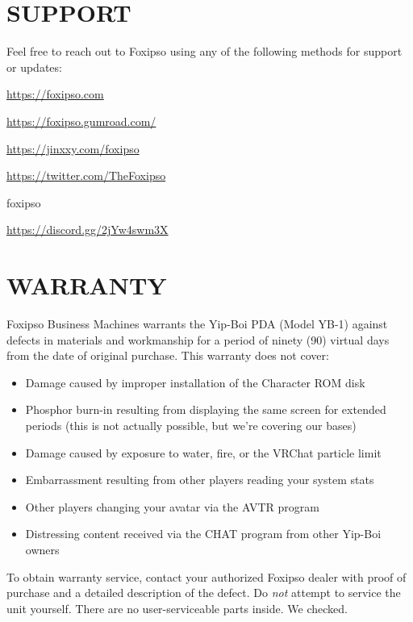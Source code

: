\documentclass[10pt]{article}
\begin{document}
\section{SUPPORT}
\label{sec:support}

Feel free to reach out to Foxipso using any of the following methods for support or updates:

\begin{description}[style=nextline, leftmargin=1em, font=\bfseries\ttfamily, nosep]
  \item[Linktr.ee] \url{https://foxipso.com}
  \item[Gumroad] \url{https://foxipso.gumroad.com/}
  \item[Jinxxy] \url{https://jinxxy.com/foxipso}
  \item[X/Twitter] \url{https://twitter.com/TheFoxipso}
  \item[Discord] foxipso
  \item[Foxipso's Den Discord] \url{https://discord.gg/2jYw4swm3X}
\end{description}

\section{WARRANTY}
\label{sec:warranty}

Foxipso Business Machines warrants the Yip-Boi PDA (Model YB-1) against defects in materials and workmanship for a period of ninety (90) virtual days from the date of original purchase. This warranty does not cover:

\begin{itemize}[leftmargin=2em, nosep]
  \item Damage caused by improper installation of the Character ROM disk
  \item Phosphor burn-in resulting from displaying the same screen for extended periods (this is not actually possible, but we're covering our bases)
  \item Damage caused by exposure to water, fire, or the VRChat particle limit
  \item Embarrassment resulting from other players reading your system stats
  \item Other players changing your avatar via the AVTR program
  \item Distressing content received via the CHAT program from other Yip-Boi owners
\end{itemize}

To obtain warranty service, contact your authorized Foxipso dealer with proof of purchase and a detailed description of the defect. Do \textit{not} attempt to service the unit yourself. There are no user-serviceable parts inside. We checked.
\end{document}
